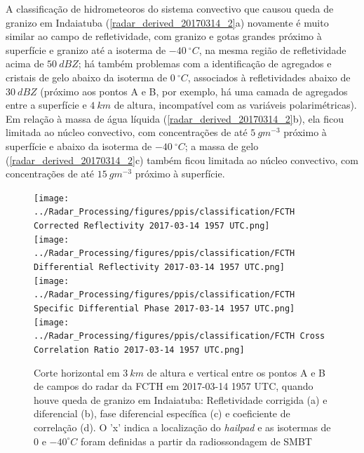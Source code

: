 A classificação de hidrometeoros do sistema convectivo que causou queda de granizo em Indaiatuba (\autoref{radar_derived_20170314_2}a) novamente é muito similar ao campo de refletividade, com granizo e gotas grandes próximo à superfície e granizo até a isoterma de $-40\:^{\circ}C$, na mesma região de refletividade acima de $50\:dBZ$; há também problemas com a identificação de agregados e cristais de gelo abaixo da isoterma de $0\:^{\circ}C$, associados à refletividades abaixo de $30\:dBZ$ (próximo aos pontos A e B, por exemplo, há uma camada de agregados entre a superfície e $4\:km$ de altura, incompatível com as variáveis polarimétricas). Em relação à massa de água líquida (\autoref{radar_derived_20170314_2}b), ela ficou limitada ao núcleo convectivo, com concentrações de até $5\:gm^{-3}$ próximo à superfície e abaixo da isoterma de $-40\:^{\circ}C$; a massa de gelo (\autoref{radar_derived_20170314_2}c) também ficou limitada ao núcleo convectivo, com concentrações de até $15\:gm^{-3}$ próximo à superfície.

\begin{figure}[hp]
	\centering
	\caption{Corte horizontal em $3\:km$ de altura e vertical entre os pontos A e B de campos do radar da FCTH em 2017-03-14 1957 UTC, quando houve queda de granizo em Indaiatuba: Refletividade corrigida (a) e diferencial (b), fase diferencial específica (c) e coeficiente de correlação (d). O 'x' indica a localização do \textit{hailpad} e as isotermas de $0$ e $-40^{\circ}C$ foram definidas a partir da radiossondagem de SMBT}
	\label{radar_20170314_2}
	\vspace{-5pt}
	\texttt{[image: ../Radar\_Processing/figures/ppis/classification/FCTH Corrected Reflectivity 2017-03-14 1957 UTC.png]} \\
	\vspace{-5pt}
	\texttt{[image: ../Radar\_Processing/figures/ppis/classification/FCTH Differential Reflectivity 2017-03-14 1957 UTC.png]} \\
	\vspace{-5pt}
	\texttt{[image: ../Radar\_Processing/figures/ppis/classification/FCTH Specific Differential Phase 2017-03-14 1957 UTC.png]} \\
	\vspace{-5pt}
	\texttt{[image: ../Radar\_Processing/figures/ppis/classification/FCTH Cross Correlation Ratio 2017-03-14 1957 UTC.png]} \\
\end{figure}

